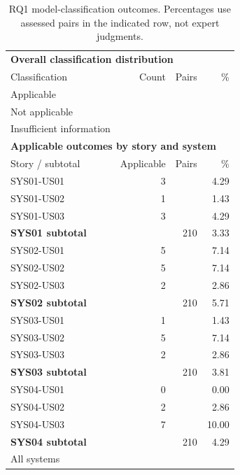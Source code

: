 \begin{table}[t]
\caption{RQ1 model-classification outcomes. Percentages use assessed pairs in the indicated row, not expert judgments.}
\label{tab:applicability-results}
\centering
\small
\begin{tabular}{lrrr}
\hline
\multicolumn{4}{l}{\textbf{Overall classification distribution}} \\
Classification & Count & Pairs & \% \\
\hline
Applicable & \StudyApplicableCount{} & \StudyAssessmentCount{} & \RqOneApplicablePercent{} \\
Not applicable & \StudyNotApplicableCount{} & \StudyAssessmentCount{} & \RqOneNotApplicablePercent{} \\
Insufficient information & \StudyInsufficientInformationCount{} & \StudyAssessmentCount{} & \RqOneInsufficientInformationPercent{} \\
\hline
\multicolumn{4}{l}{\textbf{Applicable outcomes by story and system}} \\
Story / subtotal & Applicable & Pairs & \% \\
\hline
SYS01-US01 & 3 & \StudyPatternCount{} & 4.29 \\
SYS01-US02 & 1 & \StudyPatternCount{} & 1.43 \\
SYS01-US03 & 3 & \StudyPatternCount{} & 4.29 \\
\textbf{SYS01 subtotal} & \RqOneSystemOneApplicableCount{} & 210 & 3.33 \\
\hline
SYS02-US01 & 5 & \StudyPatternCount{} & 7.14 \\
SYS02-US02 & 5 & \StudyPatternCount{} & 7.14 \\
SYS02-US03 & 2 & \StudyPatternCount{} & 2.86 \\
\textbf{SYS02 subtotal} & \RqOneSystemTwoApplicableCount{} & 210 & 5.71 \\
\hline
SYS03-US01 & 1 & \StudyPatternCount{} & 1.43 \\
SYS03-US02 & 5 & \StudyPatternCount{} & 7.14 \\
SYS03-US03 & 2 & \StudyPatternCount{} & 2.86 \\
\textbf{SYS03 subtotal} & \RqOneSystemThreeApplicableCount{} & 210 & 3.81 \\
\hline
SYS04-US01 & 0 & \StudyPatternCount{} & 0.00 \\
SYS04-US02 & 2 & \StudyPatternCount{} & 2.86 \\
SYS04-US03 & 7 & \StudyPatternCount{} & 10.00 \\
\textbf{SYS04 subtotal} & \RqOneSystemFourApplicableCount{} & 210 & 4.29 \\
\hline
All systems & \StudyApplicableCount{} & \StudyAssessmentCount{} & \RqOneApplicablePercent{} \\
\hline
\end{tabular}
\end{table}
